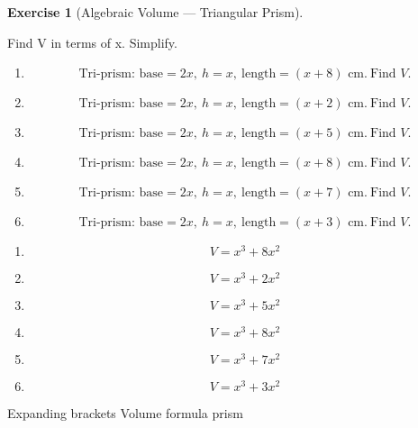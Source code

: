 \documentclass[
  letterpaper,
  DIV=11,
  numbers=noendperiod]{scrreprt}
\theoremstyle{definition}
\newtheorem{exercise}{Exercise}[chapter]
\theoremstyle{remark}
\begin{document}
\begin{exercise}[Algebraic Volume --- Triangular
Prism]\protect\hypertarget{exr-alg-2}{}\label{exr-alg-2}

Find V in terms of x. Simplify.

\begin{enumerate}
\def\labelenumi{\alph{enumi})}
\item
  \[\text{Tri-prism: base}=2x,\ h=x,\ \text{length}=(x+8)\text{ cm.}\ \text{Find }V.\]
\item
  \[\text{Tri-prism: base}=2x,\ h=x,\ \text{length}=(x+2)\text{ cm.}\ \text{Find }V.\]
\item
  \[\text{Tri-prism: base}=2x,\ h=x,\ \text{length}=(x+5)\text{ cm.}\ \text{Find }V.\]
\item
  \[\text{Tri-prism: base}=2x,\ h=x,\ \text{length}=(x+8)\text{ cm.}\ \text{Find }V.\]
\item
  \[\text{Tri-prism: base}=2x,\ h=x,\ \text{length}=(x+7)\text{ cm.}\ \text{Find }V.\]
\item
  \[\text{Tri-prism: base}=2x,\ h=x,\ \text{length}=(x+3)\text{ cm.}\ \text{Find }V.\]
\end{enumerate}

\begin{tcolorbox}[enhanced jigsaw, opacitybacktitle=0.6, coltitle=black, arc=.35mm, colframe=quarto-callout-tip-color-frame, colback=white, bottomrule=.15mm, left=2mm, colbacktitle=quarto-callout-tip-color!10!white, titlerule=0mm, opacityback=0, title=\textcolor{quarto-callout-tip-color}{\faLightbulb}\hspace{0.5em}{🔍 View Solution}, leftrule=.75mm, breakable, rightrule=.15mm, bottomtitle=1mm, toptitle=1mm, toprule=.15mm]

\begin{enumerate}
\def\labelenumi{\alph{enumi})}
\item
  \[V=x^3+8x^2\]
\item
  \[V=x^3+2x^2\]
\item
  \[V=x^3+5x^2\]
\item
  \[V=x^3+8x^2\]
\item
  \[V=x^3+7x^2\]
\item
  \[V=x^3+3x^2\]
\end{enumerate}

\end{tcolorbox}

{Expanding brackets} {Volume formula prism}

\end{exercise}
\end{document}
